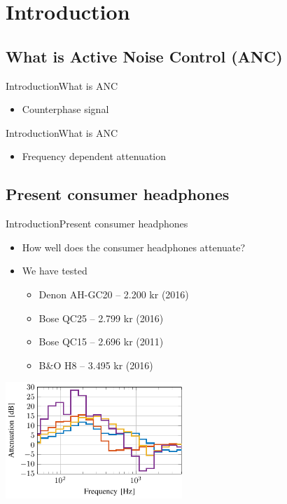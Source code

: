 \section{Introduction}
\subsection{What is Active Noise Control (ANC)}
\begin{frame}{Introduction}{What is ANC}		
	\begin{itemize}
		\item Counterphase signal
	\end{itemize}
\end{frame}
\begin{frame}{Introduction}{What is ANC}		
	\begin{itemize}
		\item Frequency dependent attenuation
	\end{itemize}
\end{frame}

\subsection{Present consumer headphones}
\begin{frame}{Introduction}{Present consumer headphones}		
	\begin{itemize}
		\item How well does the consumer headphones attenuate?
		\item We have tested
		\begin{itemize}
			\item Denon AH-GC20 -- 2.200 kr (2016)
			\item Bose QC25 	-- 2.799 kr (2016)
			\item Bose QC15 	-- 2.696 kr (2011)
			\item B\&O H8 		-- 3.495 kr (2016)
		\end{itemize}
	\end{itemize}
	\begin{center}
		\includegraphics[width=0.5\textwidth]{figures/ComparedConusmerHP}
	\end{center}	
\end{frame}





